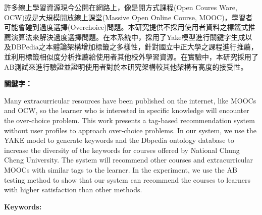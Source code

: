 \begin{abstractzh}
許多線上學習資源現今公開在網路上，像是開方式課程(Open Coures Ware, OCW)或是大規模開放線上課堂(Massive Open Online Course, MOOC)，學習者可能會碰到過度選擇(Overchoice)問題。本研究提供不採用使用者資料之標籤式推薦演算法來解決過度選擇問題。在本系統中，採用了Yake模型進行關鍵字生成以及DBPedia之本體論架構增加標籤之多樣性，針對國立中正大學之課程進行推薦，並利用標籤相似度分析推薦給使用者其他校外學習資源。在實驗中，本研究採用了AB測試來進行驗證並證明使用者對於本研究架構較其他架構有高度的接受性。

\bigbreak
\noindent \textbf{關鍵字：}{\, \makeatletter \@keywordszh \makeatother}
\end{abstractzh}

\begin{abstracten}
Many extracurricular resources have been published on the internet, like MOOCs and OCW, so the learner who is interested in specific knowledge will encounter the over-choice problem. This work presents a tag-based recommendation system without user profiles to approach over-choice problems. In our system, we use the YAKE model to generate keywords and the Dbpedia ontology database to increase the diversity of the keywords for courses offered by National Chung Cheng University. The system will recommend other courses and extracurricular MOOCs with similar tags to the learner. In the experiment, we use the AB testing method to show that our system can recommend the courses to learners with higher satisfaction than other methods.

\bigbreak
\noindent \textbf{Keywords:}{\, \makeatletter \@keywordsen \makeatother}
\end{abstracten}

\begin{comment}
\category{I2.10}{Computing Methodologies}{Artificial Intelligence --
Vision and Scene Understanding} \category{H5.3}{Information
Systems}{Information Interfaces and Presentation (HCI) -- Web-based
Interaction.}

\terms{Design, Human factors, Performance.}

\keywords{Region of interest, Visual attention model, Web-based
games, Benchmarks.}
\end{comment}
